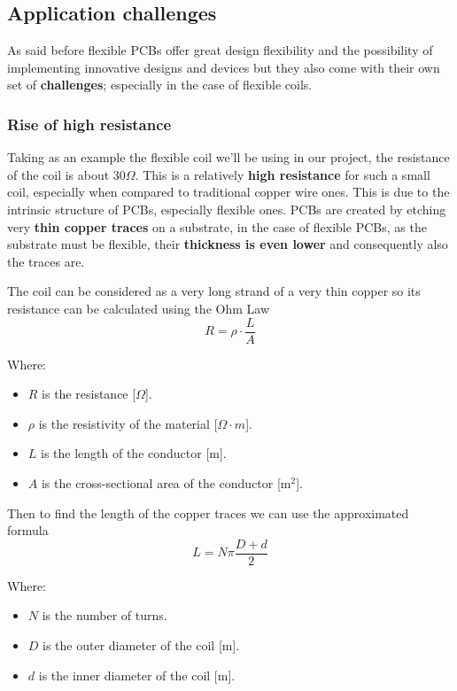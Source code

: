 \subsection{Application challenges}
\label{subsec: Application challenges}
As said before flexible PCBs offer great design flexibility and the possibility of implementing innovative designs and devices but they also come with their own set of \textbf{challenges}; especially in the case of flexible coils.

\subsubsection{Rise of high resistance}
Taking as an example the flexible coil we'll be using in our project, the resistance of the coil is about 30\(\Omega\). This is a relatively \textbf{high resistance} for such a small coil, especially when compared to traditional copper wire ones. 
This is due to the intrinsic structure of PCBs, especially flexible ones.
PCBs are created by etching very \textbf{thin copper traces} on a substrate, in the case of flexible PCBs, as the substrate must be flexible, their \textbf{thickness is even lower} and consequently also the traces are.

\begin{samepage}
    The coil can be considered as a very long strand of a very thin copper so its resistance can be calculated using the Ohm Law
    \begin{equation*}
        R=\rho \cdot \frac{L}{A}
    \end{equation*}
    \nopagebreak

    Where:
    \begin{itemize}
        \item \( R \) is the resistance [\(\Omega\)].
        \item \( \rho \) is the resistivity of the material [\(\Omega \cdot m\)].
        \item \( L \) is the length of the conductor [m].
        \item \( A \) is the cross-sectional area of the conductor [m\(^2\)].
    \end{itemize}
\end{samepage}

\begin{samepage}
    Then to find the length of the copper traces we can use the approximated formula \cite{Length_of_a_Spiral}
    \begin{equation*}
        L = N \pi \frac{D+d}{2}
    \end{equation*}
    \nopagebreak 

    Where:
    \begin{itemize}
        \item \( N \) is the number of turns.
        \item \( D \) is the outer diameter of the coil [m].
        \item \( d \) is the inner diameter of the coil [m].
    \end{itemize}
\end{samepage}

